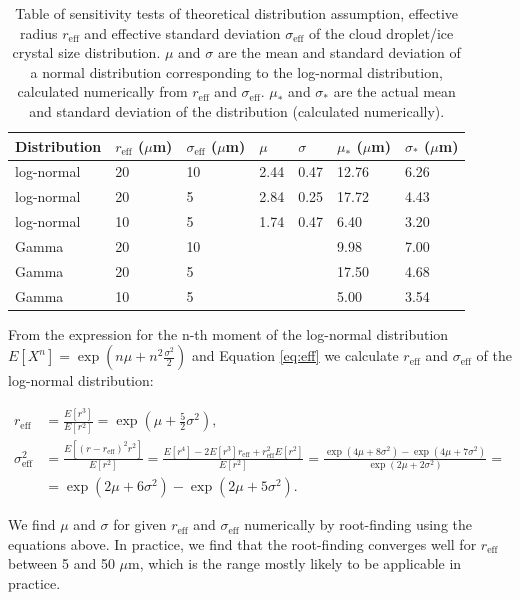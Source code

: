\begin{table}
\caption[Table of sensitivity tests]{Table of sensitivity tests of theoretical distribution assumption,
effective radius $r_\text{eff}$ and effective standard deviation
$\sigma_\text{eff}$ of the cloud droplet/ice crystal size distribution.
$\mu$ and $\sigma$ are the mean and standard deviation
of a normal distribution corresponding to the log-normal distribution,
calculated numerically from $r_\text{eff}$ and $\sigma_\text{eff}$.
$\mu_*$ and $\sigma_*$ are the actual mean and standard deviation of the
distribution (calculated numerically).}
\label{tab:3:size-dist}
\centering
\begin{tabular}{lllllll}
\hline
Distribution & $r_\text{eff}$ ($\mu$m) & $\sigma_\text{eff}$ ($\mu$m) & $\mu$ & $\sigma$ & $\mu_*$ ($\mu$m) & $\sigma_*$ ($\mu$m) \\
\hline
log-normal & 20 & 10 & 2.44 & 0.47 & 12.76 & 6.26 \\
log-normal & 20 & 5 & 2.84 & 0.25 & 17.72 & 4.43 \\
log-normal & 10 & 5 & 1.74 & 0.47 & 6.40 & 3.20 \\
Gamma & 20 & 10 & & & 9.98 & 7.00 \\
Gamma & 20 & 5 & & & 17.50 & 4.68 \\
Gamma & 10 & 5 & & & 5.00 & 3.54 \\
\hline
\end{tabular}
\end{table}

From the expression for the n-th moment of the log-normal distribution
$E[X^n] = \exp(n\mu + n^2\frac{\sigma^2}{2})$ and Equation \eqref{eq:eff}
we calculate $r_\text{eff}$ and $\sigma_\text{eff}$ of the log-normal distribution:

\begin{align}
r_\text{eff} &= \frac{E[r^3]}{E[r^2]} = \exp(\mu + \frac{5}{2}\sigma^2) ,\\
\sigma_\text{eff}^2 &= \frac{E[(r-r_\text{eff})^2r^2]}{E[r^2]} = \frac{E[r^4] - 2E[r^3]r_\text{eff} + r_\text{eff}^2E[r^2]}{E[r^2]} = \frac{\exp(4\mu + 8\sigma^2) - \exp(4\mu + 7\sigma^2)}{\exp(2\mu + 2\sigma^2)} = \nonumber\\
&= \exp(2\mu + 6\sigma^2) - \exp(2\mu + 5\sigma^2).
\end{align}

We find $\mu$ and $\sigma$ for given $r_\text{eff}$ and $\sigma_\text{eff}$
numerically by root-finding using the equations above. In practice,
we find that the root-finding converges well for $r_\text{eff}$ between 5
and 50 $\mu$m, which is the range mostly likely to be applicable in practice.

